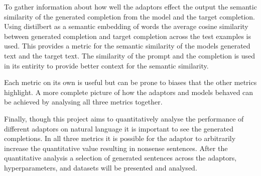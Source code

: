 To gather information about how well the adaptors effect the output the semantic similarity of the generated completion from the model and the target completion.
Using distilbert \citep{distilbert} as a semantic embedding of words the average cosine similarity between generated completion and target completion across the test examples is used.
This provides a metric for the semantic similarity of the models generated text and the target text.
The similarity of the prompt and the completion is used in its entirity to provide better context for the semantic similarity.

Each metric on its own is useful but can be prone to biases that the other metrics highlight.
A more complete picture of how the adaptors and models behaved can be achieved by analysing all three metrics together.

Finally, though this project aims to quantitatively analyse the performance of different adaptors on natural language it is important to see the generated completions.
In all three metrics it is possible for the adaptor to arbitrarily increase the quantitative value resulting in nonsense sentences.
After the quantitative analysis a selection of generated sentences across the adaptors, hyperparameters, and datasets will be presented and analysed.
